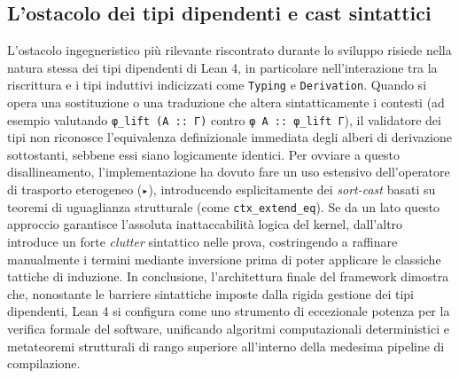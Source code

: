 \subsection{L'ostacolo dei tipi dipendenti e cast sintattici}
L'ostacolo ingegneristico più rilevante riscontrato durante lo sviluppo risiede nella natura stessa dei tipi dipendenti di Lean 4, in particolare nell'interazione tra la riscrittura e i tipi induttivi indicizzati come \texttt{Typing} 
e \texttt{Derivation}. Quando si opera una sostituzione o una traduzione che altera sintatticamente i contesti (ad esempio valutando \texttt{φ\_lift (A :: Γ)} contro \texttt{φ A :: φ\_lift Γ}), il validatore dei tipi non riconosce 
l'equivalenza definizionale immediata degli alberi di derivazione sottostanti, sebbene essi siano logicamente identici. Per ovviare a questo disallineamento, l'implementazione ha dovuto fare un uso estensivo dell'operatore di trasporto 
eterogeneo (\texttt{▸}), introducendo esplicitamente dei \emph{sort-cast} basati su teoremi di uguaglianza strutturale (come \texttt{ctx\_extend\_eq}). Se da un lato questo approccio garantisce l'assoluta inattaccabilità logica del kernel, 
dall'altro introduce un forte \emph{clutter} sintattico nelle prova, costringendo a raffinare manualmente i termini mediante inversione prima di poter applicare le classiche tattiche di induzione. In conclusione, l'architettura finale del 
framework dimostra che, nonostante le barriere sintattiche imposte dalla rigida gestione dei tipi dipendenti, Lean 4 si configura come uno strumento di eccezionale potenza per la verifica formale del software, unificando algoritmi computazionali 
deterministici e metateoremi strutturali di rango superiore all'interno della medesima pipeline di compilazione.